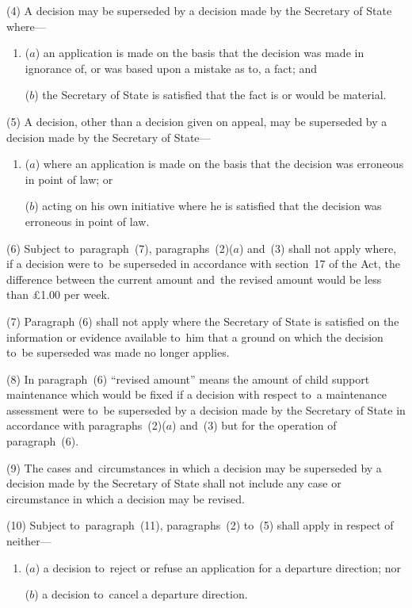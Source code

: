 \documentclass[12pt,a4paper]{article}
\begin{document}
(4) A decision may be superseded by a decision made by the Secretary of State where---
\begin{enumerate}\item[]
($a$) an application is made on the basis that the decision was made in ignorance of, or was based upon a mistake as to, a fact; and

($b$) the Secretary of State is satisfied that the fact is or would be material.
\end{enumerate}

(5) A decision, other than a decision given on appeal, may be superseded by a decision made by the Secretary of State---
\begin{enumerate}\item[]
($a$) where an application is made on the basis that the decision was erroneous in point of law; or

($b$) acting on his own initiative where he is satisfied that the decision was erroneous in point of law.
\end{enumerate}

(6) Subject to~paragraph~(7), paragraphs~(2)($a$) and~(3) shall not apply where, if a decision were to~be superseded in accordance with section~17 of the Act, the difference between the current amount and~the revised amount would be less than £1$.$00 per week.

(7) Paragraph (6) shall not apply where the Secretary of State is satisfied on the information or evidence available to~him that a ground on which the decision to~be superseded was made no longer applies.

(8) In paragraph~(6) “revised amount” means the amount of child support maintenance which would be fixed if a decision with respect to~a maintenance assessment were to~be superseded by a decision made by the Secretary of State in accordance with paragraphs~(2)($a$) and~(3) but for the operation of paragraph~(6).

(9) The cases and~circumstances in which a decision may be superseded by a decision made by the Secretary of State shall not include any case or circumstance in which a decision may be revised.

(10) Subject to~paragraph~(11), paragraphs~(2) to~(5) shall apply in respect of neither---
\begin{enumerate}\item[]
($a$) a decision to~reject or refuse an application for a departure direction; nor

($b$) a decision to~cancel a departure direction.
\end{enumerate}
\end{document}
